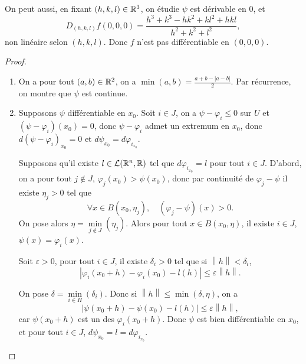 \documentclass[12pt]{article}
\begin{document}
\begin{remark}
	On peut aussi, en fixant $(h,k,l)\in\mathbb{R}^{3}$, on étudie 
	$\psi$ est dérivable en 0, et 
	\begin{equation}
		D_{(h,k,l)}f(0,0,0)=\frac{h^{3}+k^{3}-hk^{2}+kl^{2}+hkl}{h^{2}+k^{2}+l^{2}},
	\end{equation}
	non linéaire selon $(h,k,l)$. Donc $f$ n'est pas différentiable en $(0,0,0)$.
\end{remark}

\begin{proof}
	\phantom{}
	\begin{enumerate}
		\item On a pour tout $(a,b)\in\mathbb{R}^{2}$, on a $\min(a,b)=\frac{a+b-\left\lvert a-b\right\rvert}{2}$. Par récurrence, on montre que $\psi$ est continue.
		\item Supposons $\psi$ différentiable en $x_0$. Soit $i\in J$, on a $\psi-\varphi_i\leqslant0$ sur $U$ et $(\psi-\varphi_i)(x_0)=0$, donc $\psi-\varphi_i$ admet un extremum en $x_0$, donc $d(\psi-\varphi_i)_{x_0}=0$ et $d\psi_{x_0}=d\varphi_{{i}_{x_0}}$.
		
		Supposons qu'il existe $l\in\mathcal{L}(\mathbb{R}^{n},\mathbb{R})$ tel que $d\varphi_{i_{x_0}}=l$ pour tout $i\in J$. D'abord, on a pour tout $j\not\in J$, $\varphi_j(x_0)>\psi(x_0)$, donc par continuité de $\varphi_j-\psi$ il existe $\eta_j>0$ tel que 
		\begin{equation}
			\forall x\in B(x_0,\eta_j),\quad (\varphi_j-\psi)(x)>0.
		\end{equation}
		On pose alors $\eta=\min\limits_{j\not\in J}(\eta_j)$. Alors pour tout $x\in B(x_0,\eta)$, il existe $i\in J$, $\psi(x)=\varphi_i(x)$.

		Soit $\varepsilon>0$, pour tout $i\in J$, il existe $\delta_{i}>0$ tel que si $\left\lVert h\right\rVert<\delta_{i}$,
		\begin{equation}
			\left\lvert\varphi_i(x_0+h)-\varphi_i(x_0)-l(h)\right\rvert\leqslant\varepsilon\left\lVert h\right\rVert.
		\end{equation}

		On pose $\delta=\min\limits_{i\in H}(\delta_i)$. Donc si $\left\lVert h\right\rVert\leqslant\min(\delta,\eta)$, on a 
		\begin{equation}
			\left\lvert\psi(x_0+h)-\psi(x_0)-l(h)\right\rvert\leqslant\varepsilon\left\lVert h\right\rVert,
		\end{equation}
		car $\psi(x_0+h)$ est un des $\varphi_i(x_0+h)$. Donc $\psi$ est bien différentiable en $x_0$, et pour tout $i\in J$, $d\psi_{x_0}=l=d\varphi_{i_{x_0}}$.


\end{enumerate}
\end{proof}
\end{document}
